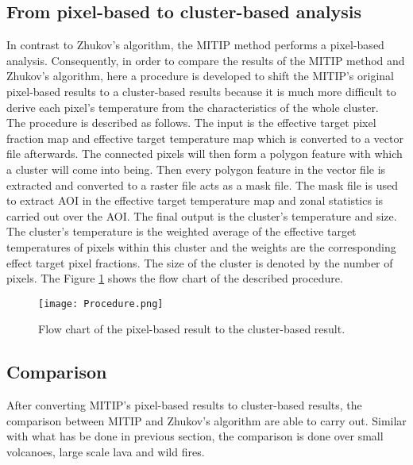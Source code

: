 \subsection{From pixel-based to cluster-based analysis}
In contrast to Zhukov's algorithm, the MITIP method performs a pixel-based analysis. Consequently, in order to compare the results of the MITIP method and Zhukov's algorithm, here a procedure is developed to shift the MITIP's original pixel-based results to a cluster-based results because it is much more difficult to derive each pixel's temperature from the characteristics of the whole cluster. \\

\noindent The procedure is described as follows. The input is the effective target pixel fraction map and effective target temperature map which is converted to a vector file afterwards. The connected pixels will then form a polygon feature with which a cluster will come into being. Then every polygon feature in the vector file is extracted and converted to a raster file acts as a mask file. The mask file is used to extract AOI in the effective target temperature map and zonal statistics is carried out over the AOI. The final output is the cluster's temperature and size. The cluster's temperature is the weighted average of the effective target temperatures of pixels within this cluster and the weights are the corresponding effect target pixel fractions. The size of the cluster is denoted by the number of pixels. The Figure \ref{fig:P2C} shows the flow chart of the described procedure.\\

\begin{figure}[!htbp]
\centering
\texttt{[image: Procedure.png]}
\caption{Flow chart of the pixel-based result to the cluster-based result.}
\label{fig:P2C}
\end{figure}


\subsection{Comparison}
After converting MITIP's pixel-based results to cluster-based results, the comparison between MITIP and Zhukov's algorithm are able to carry out. Similar with what has be done in previous section, the comparison is done over small volcanoes, large scale lava and wild fires.\\

